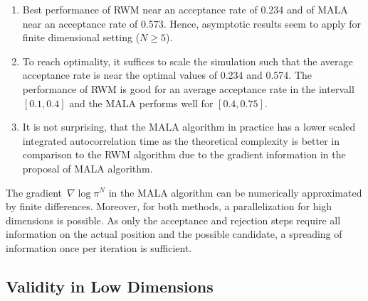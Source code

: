\begin{enumerate}
 \item Best performance of RWM near an acceptance rate of 0.234 and of MALA near an acceptance rate of 0.573. Hence, asymptotic results seem to apply for finite dimensional setting ($N \geq 5$).
 \item To reach optimality, it suffices to scale the simulation such that the average acceptance rate is near the optimal values of 0.234 and 0.574. The performance of RWM is good for an average acceptance rate in the intervall $[0.1, 0.4]$ and the MALA performs well for $[0.4, 0.75]$.
 \item It is not surprising, that the MALA algorithm  in practice has a lower scaled integrated autocorrelation time as the theoretical complexity is better in comparison to the RWM algorithm due to the gradient information in the proposal of MALA algorithm.
\end{enumerate}

\begin{rem}
 The gradient~$\nabla \log \pi^{N}$ in the MALA algorithm can be numerically approximated by finite differences. Moreover, for both methods, a parallelization for high dimensions is possible. As only the acceptance and rejection steps require all information on the actual position and the possible candidate, a spreading of information once per iteration is sufficient.
\end{rem}


\subsection{Validity in Low Dimensions}
\label{sub:sec:Numericals Low dimensions}

